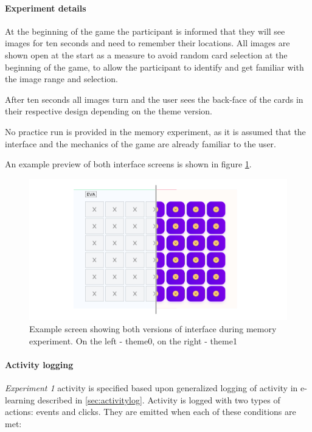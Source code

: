 		\paragraph{Experiment details}
		
		At the beginning of the game the participant is informed that they will see images for ten seconds and need to remember their locations. All images are shown open at the start as a measure to avoid random card selection at the beginning of the game, to allow the participant to identify and get familiar with the image range and selection.
		
		After ten seconds all images turn and the user sees the back-face of the cards in their respective design depending on the theme version.
		
		No practice run is provided in the memory experiment, as it is assumed that the interface and the mechanics of the game are already familiar to the user.

		An example preview of both interface screens is shown in figure \ref{fig:memory-versions}.
		
\begin{figure}
	\centering
	\includegraphics[width=1\linewidth]{"graphics/memory versions"}
	\caption{Example screen showing both versions of interface during memory experiment. On the left - theme0, on the right - theme1}
	\label{fig:memory-versions}
\end{figure}

		\paragraph{Activity logging}
		
		\textit{Experiment 1} activity is specified based upon generalized logging of activity in e-learning described in \ref{sec:activitylog}. Activity is logged with two types of actions: events and clicks. They are emitted when each of these conditions are met:
		
